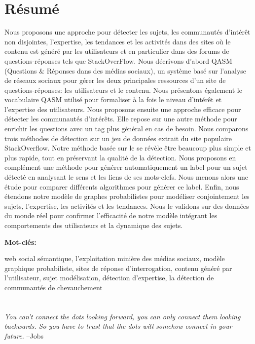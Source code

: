 \documentclass[a4paper,11pt,twoside]{ThesisStyle}
\begin{document}
\section*{R\'esum\'e}
Nous proposons une approche pour d\'etecter les sujets, les communaut\'es d'int\'er\^et non disjointes, l'expertise, les tendances et les activit\'es dans des sites o\`u le contenu est g\'en\'er\'e par les utilisateurs et en particulier dans des forums de questions-r\'eponses tels que StackOverFlow. Nous d\'ecrivons d'abord QASM (Questions \& R\'eponses dans des m\'edias sociaux), un syst\`eme bas\'e sur l'analyse de r\'eseaux sociaux pour g\'erer les deux principales ressources d’un site de questions-r\'eponses: les utilisateurs et le contenu. Nous pr\'esentons \'egalement le vocabulaire QASM utilis\'e pour formaliser \`a la fois le niveau d'int\'er\^et et l'expertise des utilisateurs. Nous proposons ensuite une approche efficace pour d\'etecter les communaut\'es d'int\'er\^ets. Elle repose sur une autre m\'ethode pour enrichir les questions avec un tag plus g\'en\'eral en cas de besoin. Nous comparons trois m\'ethodes de d\'etection sur un jeu de donn\'ees extrait du site populaire StackOverflow. Notre m\'ethode bas\'ee sur le se r\'ev\`ele \^etre beaucoup plus simple et plus rapide, tout en pr\'eservant la qualit\'e de la d\'etection. Nous proposons en compl\'ement une m\'ethode pour g\'en\'erer automatiquement un label pour un sujet d\'etect\'e en analysant le sens et les liens de ses mots-clefs. Nous menons alors une \'etude pour comparer diff\'erents algorithmes pour g\'en\'erer ce label. Enfin, nous \'etendons notre mod\`ele de graphes probabilistes pour mod\'eliser conjointement les sujets, l'expertise, les activit\'es et les tendances. Nous le validons sur des donn\'ees du monde r\'eel pour confirmer l'efficacit\'e de notre mod\`ele int\'egrant les comportements des utilisateurs et la dynamique des sujets.

\textbf{Mot-cl\'es:}

web social s\'emantique,
l'exploitation mini\`ere des m\'edias sociaux,
mod\`ele graphique probabiliste,
sites de r\'eponse d'interrogation, 
contenu g\'en\'er\'e par l'utilisateur,
sujet mod\'elisation,
d\'etection d'expertise,
la d\'etection de communaut\'es de chevauchement


 
\cleardoublepage
\section*{}
\begin{vcenterpage}
\textit{You can't connect the dots looking forward, you can only connect them looking backwards. So you have to trust that the dots will somehow connect in your future.}  --Jobs
\end{vcenterpage}
\end{document}
